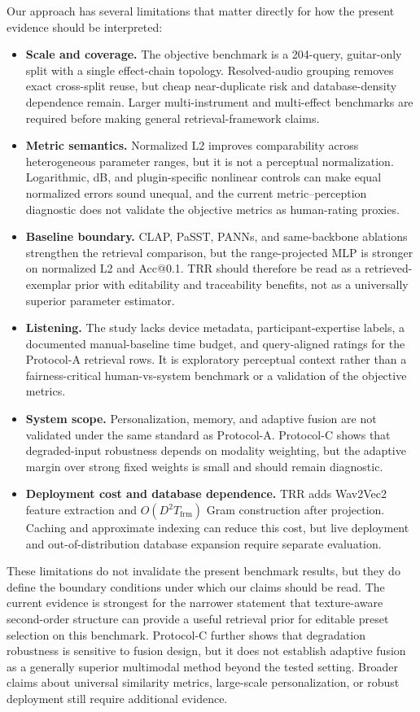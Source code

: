 Our approach has several limitations that matter directly for how the present evidence should be interpreted:
\begin{itemize}
	\item \textbf{Scale and coverage.} The objective benchmark is a 204-query, guitar-only split with a single effect-chain topology. Resolved-audio grouping removes exact cross-split reuse, but cheap near-duplicate risk and database-density dependence remain. Larger multi-instrument and multi-effect benchmarks are required before making general retrieval-framework claims.
	\item \textbf{Metric semantics.} Normalized L2 improves comparability across heterogeneous parameter ranges, but it is not a perceptual normalization. Logarithmic, dB, and plugin-specific nonlinear controls can make equal normalized errors sound unequal, and the current metric--perception diagnostic does not validate the objective metrics as human-rating proxies.
	\item \textbf{Baseline boundary.} CLAP, PaSST, PANNs, and same-backbone ablations strengthen the retrieval comparison, but the range-projected MLP is stronger on normalized L2 and Acc@0.1. TRR should therefore be read as a retrieved-exemplar prior with editability and traceability benefits, not as a universally superior parameter estimator.
	\item \textbf{Listening.} The study lacks device metadata, participant-expertise labels, a documented manual-baseline time budget, and query-aligned ratings for the Protocol-A retrieval rows. It is exploratory perceptual context rather than a fairness-critical human-vs-system benchmark or a validation of the objective metrics.
	\item \textbf{System scope.} Personalization, memory, and adaptive fusion are not validated under the same standard as Protocol-A. Protocol-C shows that degraded-input robustness depends on modality weighting, but the adaptive margin over strong fixed weights is small and should remain diagnostic.
	\item \textbf{Deployment cost and database dependence.} TRR adds Wav2Vec2 feature extraction and $O(D^2T_{\text{frm}})$ Gram construction after projection. Caching and approximate indexing can reduce this cost, but live deployment and out-of-distribution database expansion require separate evaluation.
\end{itemize}

These limitations do not invalidate the present benchmark results, but they do define the boundary conditions under which our claims should be read. The current evidence is strongest for the narrower statement that texture-aware second-order structure can provide a useful retrieval prior for editable preset selection on this benchmark. Protocol-C further shows that degradation robustness is sensitive to fusion design, but it does not establish adaptive fusion as a generally superior multimodal method beyond the tested setting. Broader claims about universal similarity metrics, large-scale personalization, or robust deployment still require additional evidence.

